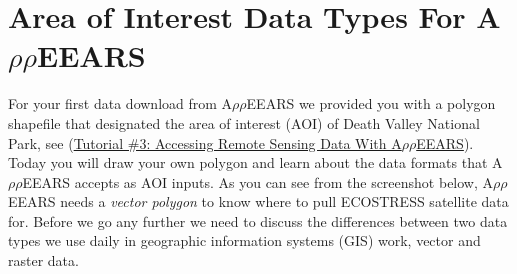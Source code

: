 \documentclass[oneside,a4paper,11pt,explicit]{book}
\begin{document}
	\noindent{}
	
	\vspace{1 em}

	\section{Area of Interest Data Types For A$\rho\rho$EEARS}

For your first data download from A$\rho\rho$EEARS we provided you with a polygon shapefile that designated the area of interest (AOI) of Death Valley National Park, see (\href{https://jeremydforsythe.github.io/icecream-tutorials/Tutorial3_AccessingRemoteSensingDataWithAppears/Tutorial3_AccessingRemoteSensingDataWithAppears.pdf}{Tutorial \#3: Accessing Remote Sensing Data With A$\rho\rho$EEARS}). Today you will draw your own polygon and learn about the data formats that A$\rho\rho$EEARS accepts as AOI inputs. As you can see from the screenshot below, A$\rho\rho$EEARS needs a \textit{vector polygon} to know where to pull ECOSTRESS satellite data for. Before we go any further we need to discuss the differences between two data types we use daily in geographic information systems (GIS) work, vector and raster data.
\end{document}
